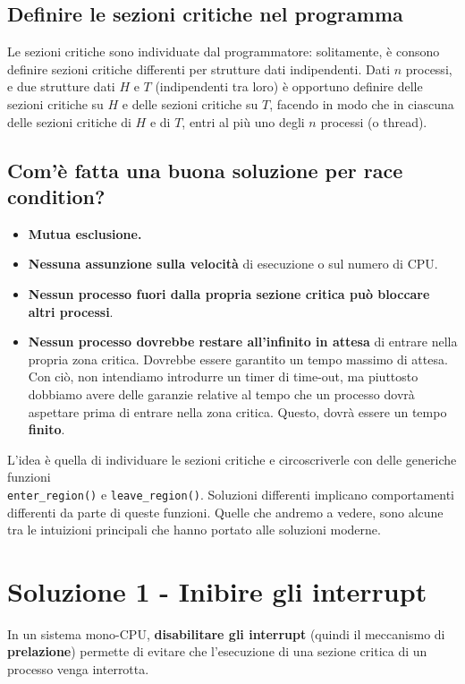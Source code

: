 \documentclass{report}
\begin{document}
\subsection{Definire le sezioni critiche nel programma}
Le sezioni critiche sono individuate dal programmatore: solitamente, è consono definire sezioni critiche differenti per strutture dati indipendenti. 
Dati $n$ processi, e due strutture dati $H$ e $T$ (indipendenti tra loro) è opportuno definire delle sezioni critiche su $H$ e delle sezioni critiche su $T$, facendo in modo che in ciascuna delle sezioni critiche di $H$ e di $T$, entri al più uno degli $n$ processi (o thread).

\subsection{Com'è fatta una buona soluzione per race condition?}

\begin{itemize}
    \item \textbf{Mutua esclusione.}
    
    \item \textbf{Nessuna assunzione sulla velocità} di esecuzione o sul numero di CPU.
    
    \item\textbf{Nessun processo fuori dalla propria sezione critica può bloccare altri processi}.

    \item \textbf{Nessun processo dovrebbe restare all'infinito in attesa} di entrare nella propria zona critica. Dovrebbe essere garantito un tempo massimo di attesa. Con ciò, non intendiamo introdurre un timer di time-out, ma piuttosto dobbiamo avere delle garanzie relative al tempo  che un processo dovrà aspettare prima di entrare nella zona critica. Questo, dovrà essere un tempo \textbf{finito}. 
\end{itemize}


L'idea è quella di individuare le sezioni critiche e circoscriverle con delle generiche funzioni \\\verb|enter_region()| e \verb|leave_region()|. Soluzioni differenti implicano comportamenti differenti da parte di queste funzioni. Quelle che andremo a vedere, sono alcune tra le intuizioni principali che hanno portato alle soluzioni moderne.

\section{Soluzione 1 - Inibire gli interrupt}
In un sistema mono-CPU, \textbf{disabilitare gli interrupt} (quindi il meccanismo di \textbf{prelazione}) permette di evitare che l'esecuzione di una sezione critica di un processo venga interrotta. 
\end{document}
